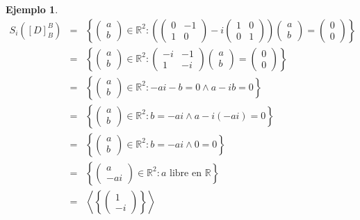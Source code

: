 \documentclass[12pt]{book}
\newtheorem{ejem}{Ejemplo}
\def\R{\mathbb{R}}
\begin{document}
\begin{ejem}
\begin{eqnarray*}
S_{i}([D]_B^B)&=&\left\{ \left(\begin{array}{c} a\\b  \end{array}\right)\in\R^2 : 
\left(\left(\begin{matrix} 0&-1 \\ 1&0 \end{matrix}\right)-i\left(\begin{matrix} 1 & 0 \\ 0 & 1   \end{matrix}\right)\right) \left(\begin{array}{c} a  \\ b \end{array}\right)=
\left(\begin{array}{c} 0 \\ 0   \end{array}\right)\right\}\\
&=&\left\{ \left(\begin{array}{c} a\\b  \end{array}\right)\in\R^2 : 
\left(\begin{matrix} -i&-1 \\ 1&-i \end{matrix}\right) \left(\begin{array}{c} a  \\ b \end{array}\right)=
\left(\begin{array}{c} 0 \\ 0   \end{array}\right)\right\}\\
&=&\left\{ \left(\begin{array}{c} a\\b  \end{array}\right)\in\R^2 : -ai-b=0 \wedge a-ib=0\right\}\\
&=&\left\{ \left(\begin{array}{c} a\\b  \end{array}\right)\in\R^2 : b=-ai \wedge a-i(-ai)=0\right\}\\
&=&\left\{ \left(\begin{array}{c} a\\b  \end{array}\right)\in\R^2 : b=-ai \wedge 0=0\right\}\\
&=&\left\{ \left(\begin{array}{c} a\\-ai  \end{array}\right)\in\R^2 : a \textrm{ libre  en } \R\right\}\\
&=&\left\langle\left\{\left(\begin{array}{r} 1\\-i  \end{array}\right)\right\}\right\rangle
\end{eqnarray*}


\end{ejem}
\end{document}
